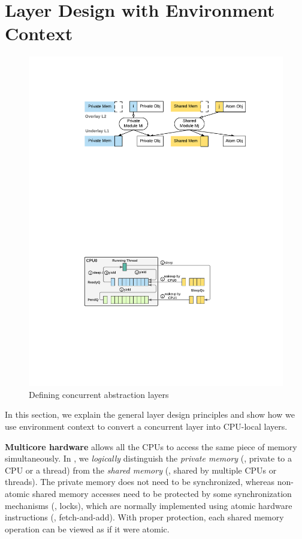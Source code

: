 \section{Layer Design with Environment Context}
\label{sec:machine}

\begin{figure}\centering
\includegraphics[scale=0.55]{figs/build_object}
\caption{Defining concurrent abstraction layers}
\vspace*{-10pt}
\label{fig:spec:object}
\end{figure}

In this section, we explain the general layer design principles and
show how we use environment context to convert a concurrent layer into
CPU-local layers.

{\bf Multicore hardware} allows all the CPUs to access the same piece of
memory simultaneously.  In {\CTOS}, we \emph{logically} distinguish
the \emph{private memory} (\ie, private to a CPU or a thread) from the
\emph{shared memory} (\ie, shared by multiple CPUs or threads).  The
private memory does not need to be synchronized, whereas non-atomic
shared memory accesses need to be protected by some synchronization
mechanisms (\eg, locks), which are normally implemented using atomic
hardware instructions (\eg, fetch-and-add). With proper protection,
each shared memory operation can be viewed as if it were atomic.

